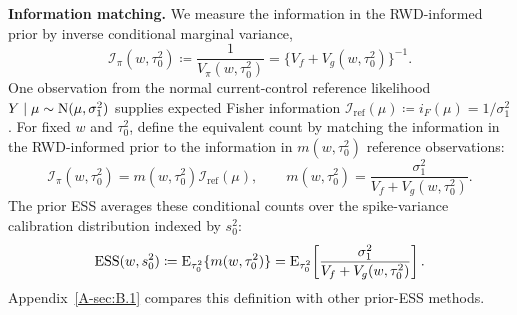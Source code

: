 \documentclass[11pt]{article}
\begin{document}
\noindent\textbf{Information matching.}
We measure the information in the RWD-informed prior by inverse conditional marginal variance,
\[
\mathcal I_{\pi}(w,\tau_0^2)
\coloneqq\frac{1}{V_{\pi}(w,\tau_0^2)}
=\{V_f+V_g(w,\tau_0^2)\}^{-1}.
\]
One observation from the normal current-control reference likelihood
$Y\mid\mu\sim\mathrm{N}(\mu,\sigma_{1}^2)$ supplies expected Fisher information
$\mathcal I_{\mathrm{ref}}(\mu)\coloneqq i_F(\mu)=1/\sigma_{1}^2$. For fixed $w$ and $\tau_0^2$, define the equivalent count by matching the information in the RWD-informed prior to the information in $m(w,\tau_0^2)$ reference observations:
\begin{equation}\label{eq:matchedcount}
\mathcal I_{\pi}(w,\tau_0^2)
=m(w,\tau_0^2)\mathcal I_{\mathrm{ref}}(\mu),
\qquad
m(w,\tau_0^2)=\frac{\sigma_{1}^2}{V_f+V_g(w,\tau_0^2)}.
\end{equation}
The prior ESS averages these conditional counts over the spike-variance calibration distribution indexed by $s_0^2$:
\begin{equation}\label{eq:essgeneral}
\operatorname{ESS}(w,s_0^2)
\coloneqq\operatorname{E}_{\tau_0^2}\{m(w,\tau_0^2)\}
=\operatorname{E}_{\tau_0^2}\!\left[
\frac{\sigma_{1}^2}{V_f+V_g(w,\tau_0^2)}
\right].
\end{equation}
Appendix~\ref{A-sec:B.1} compares this definition with other prior-ESS methods.
\end{document}
